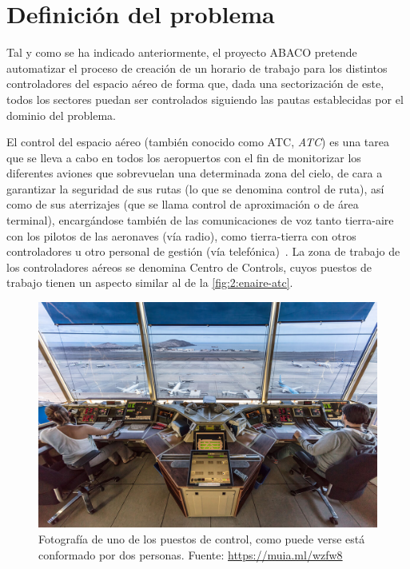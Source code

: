 \graphicspath{{capitulos/Capitulo2-Definicion-del-problema/recursos/}}


\section{Definición del problema} \label{capitulo:2}

Tal y como se ha indicado anteriormente, el proyecto ABACO pretende automatizar el proceso de creación de un horario de trabajo para los distintos controladores del espacio aéreo de forma que, dada una sectorización de este, todos los sectores puedan ser controlados siguiendo las pautas establecidas por el dominio del problema.

El control del espacio aéreo (también conocido como \gls{ATC}, \textit{\acrlong{ATC}}) es una tarea que se lleva a cabo en todos los aeropuertos con el fin de monitorizar los diferentes aviones que sobrevuelan una determinada zona del cielo, de cara a garantizar la seguridad de sus rutas (lo que se denomina control de ruta), así como de sus aterrizajes (que se llama control de aproximación o de área terminal), encargándose también de las comunicaciones de voz tanto tierra-aire con los pilotos de las aeronaves (vía radio), como tierra-tierra con otros controladores u otro personal de gestión (vía telefónica)~\cite{ENAIRE-web}.
La zona de trabajo de los controladores aéreos se denomina \glspl{Centro de Control}, cuyos puestos de trabajo tienen un aspecto similar al de la \autoref{fig:2:enaire-atc}.

\begin{figure}[htbp]
    \centering
    \includegraphics[width=0.7\linewidth]{ENAIRE-ATC}
    \caption[Fotografía de uno de los puestos de control]{Fotografía de uno de los puestos de control, como puede verse 
    está conformado por dos personas. Fuente: 
    \url{https://muia.ml/wzfw8}}
    \label{fig:2:enaire-atc}
\end{figure}


